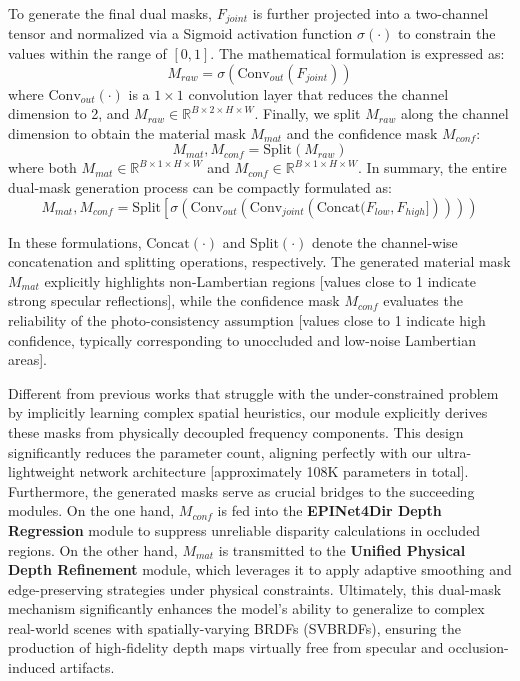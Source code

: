 To generate the final dual masks, $F_{joint}$ is further projected into a two-channel tensor and normalized via a Sigmoid activation function $\sigma(\cdot)$ to constrain the values within the range of $[0, 1]$. The mathematical formulation is expressed as:
\begin{equation}
\label{eq:eq38}
M_{raw} = \sigma(\text{Conv}_{out}(F_{joint}))
\end{equation}
where $\text{Conv}_{out}(\cdot)$ is a $1 \times 1$ convolution layer that reduces the channel dimension to 2, and $M_{raw} \in \mathbb{R}^{B \times 2 \times H \times W}$. Finally, we split $M_{raw}$ along the channel dimension to obtain the material mask $M_{mat}$ and the confidence mask $M_{conf}$:
\begin{equation}
\label{eq:eq39}
M_{mat}, M_{conf} = \text{Split}(M_{raw})
\end{equation}
where both $M_{mat} \in \mathbb{R}^{B \times 1 \times H \times W}$ and $M_{conf} \in \mathbb{R}^{B \times 1 \times H \times W}$. In summary, the entire dual-mask generation process can be compactly formulated as:
\begin{equation}
\label{eq:eq40}
M_{mat}, M_{conf} = \text{Split}\left [\sigma\left(\text{Conv}_{out}\left(\text{Conv}_{joint}\left(\text{Concat}(F_{low}, F_{high}]\right)\right)\right)\right)
\end{equation}

In these formulations, $\text{Concat}(\cdot)$ and $\text{Split}(\cdot)$ denote the channel-wise concatenation and splitting operations, respectively. The generated material mask $M_{mat}$ explicitly highlights non-Lambertian regions  [values close to 1 indicate strong specular reflections], while the confidence mask $M_{conf}$ evaluates the reliability of the photo-consistency assumption  [values close to 1 indicate high confidence, typically corresponding to unoccluded and low-noise Lambertian areas]. 

Different from previous works that struggle with the under-constrained problem by implicitly learning complex spatial heuristics, our module explicitly derives these masks from physically decoupled frequency components. This design significantly reduces the parameter count, aligning perfectly with our ultra-lightweight network architecture  [approximately 108K parameters in total]. Furthermore, the generated masks serve as crucial bridges to the succeeding modules. On the one hand, $M_{conf}$ is fed into the \textbf{EPINet4Dir Depth Regression} module to suppress unreliable disparity calculations in occluded regions. On the other hand, $M_{mat}$ is transmitted to the \textbf{Unified Physical Depth Refinement} module, which leverages it to apply adaptive smoothing and edge-preserving strategies under physical constraints. Ultimately, this dual-mask mechanism significantly enhances the model's ability to generalize to complex real-world scenes with spatially-varying BRDFs (SVBRDFs), ensuring the production of high-fidelity depth maps virtually free from specular and occlusion-induced artifacts.

